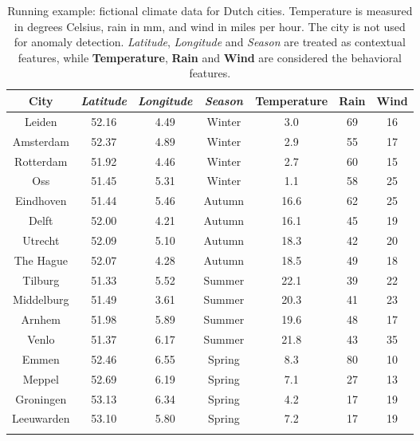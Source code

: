 \documentclass[pdflatex,sn-basic]{sn-jnl}%
\theoremstyle{thmstyleone}%
\theoremstyle{thmstyletwo}%
\theoremstyle{thmstylethree}%
\begin{document}
\begin{table}[!htbp]
\caption{Running example: fictional climate data for Dutch cities. Temperature is measured in degrees Celsius, rain in mm, and wind in miles per hour. The city is not used for anomaly detection. \emph{Latitude}, \emph{Longitude} and \emph{Season} are treated as contextual features, while \textbf{Temperature}, \textbf{Rain} and \textbf{Wind} are considered the behavioral features.}\label{tab:ExampleData}%
\begin{center}
\begin{tabular}{ccccccc}
\toprule
City & \emph{Latitude} & \emph{Longitude} & \emph{Season} & \textbf{Temperature} & \textbf{Rain} & \textbf{Wind}\\
\midrule
Leiden & 52.16 & 4.49 & Winter & 3.0 & 69 & 16\\
Amsterdam & 52.37 &  4.89 & Winter & 2.9 & 55 & 17\\
Rotterdam & 51.92 &  4.46 & Winter & 2.7 & 60 & 15\\
Oss & 51.45 &  5.31 & Winter & 1.1 & 58 & 25\\
Eindhoven & 51.44 &  5.46 & Autumn & 16.6 & 62 & 25\\
Delft & 52.00 & 4.21 & Autumn & 16.1 & 45 & 19\\
Utrecht & 52.09 &  5.10 & Autumn & 18.3 & 42 & 20\\
The Hague & 52.07 &   4.28 & Autumn & 18.5 & 49 & 18\\
Tilburg & 51.33 &  5.52 & Summer & 22.1 & 39 & 22\\
Middelburg & 51.49 &  3.61 & Summer & 20.3 & 41 & 23\\
Arnhem & 51.98 & 5.89 & Summer & 19.6 & 48 & 17\\
Venlo & 51.37 & 6.17 & Summer & 21.8 & 43 & 35\\
Emmen & 52.46 &  6.55 & Spring & 8.3 & 80 & 10\\
Meppel & 52.69 &  6.19  & Spring & 7.1 & 27 & 13\\
Groningen & 53.13 &  6.34 & Spring & 4.2 & 17 & 19\\
Leeuwarden & 53.10 &  5.80 & Spring & 7.2 & 17 & 19\\
\botrule
\end{tabular}
\end{center}
\end{table}
\end{document}
